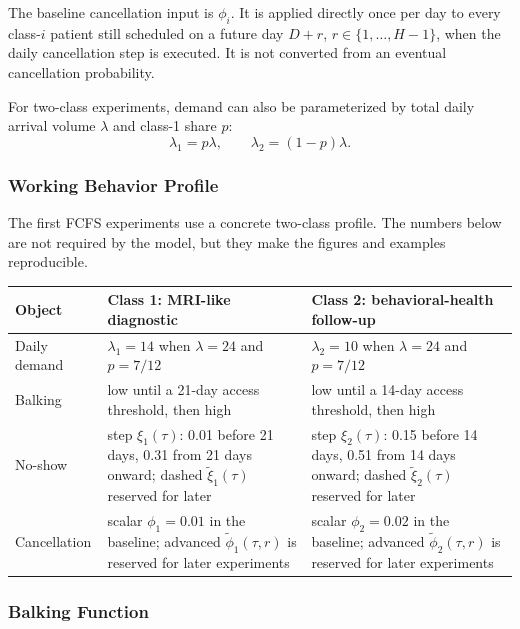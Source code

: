 \documentclass[11pt]{article}
\begin{document}
The baseline cancellation input is \(\phi_i\). It is applied directly once per day to every
class-\(i\) patient still scheduled on a future day \(D+r\), \(r\in\{1,\dots,H-1\}\), when the daily
cancellation step is executed. It is not converted from an eventual cancellation probability.

For two-class experiments, demand can also be parameterized by total daily arrival volume
\(\lambda\) and class-1 share \(p\):
\[
\lambda_1=p\lambda,\qquad
\lambda_2=(1-p)\lambda.
\]

\subsubsection{Working Behavior Profile}

The first FCFS experiments use a concrete two-class profile. The numbers below are not required by
the model, but they make the figures and examples reproducible.

\begin{center}
\small
\begin{tabular}{L{0.24\textwidth} L{0.31\textwidth} L{0.31\textwidth}}
\toprule
\textbf{Object} & \textbf{Class 1: MRI-like diagnostic} & \textbf{Class 2: behavioral-health follow-up} \\
\midrule
Daily demand & \(\lambda_1=14\) when \(\lambda=24\) and \(p=7/12\) & \(\lambda_2=10\) when \(\lambda=24\) and \(p=7/12\) \\
\addlinespace
Balking & low until a 21-day access threshold, then high & low until a 14-day access threshold, then high \\
\addlinespace
No-show & step \(\xi_1(\tau)\): 0.01 before 21 days, 0.31 from 21 days onward; dashed \(\tilde{\xi}_1(\tau)\) reserved for later & step \(\xi_2(\tau)\): 0.15 before 14 days, 0.51 from 14 days onward; dashed \(\tilde{\xi}_2(\tau)\) reserved for later \\
\addlinespace
Cancellation & scalar \(\phi_1=0.01\) in the baseline; advanced \(\tilde{\phi}_1(\tau,r)\) is reserved for later experiments & scalar \(\phi_2=0.02\) in the baseline; advanced \(\tilde{\phi}_2(\tau,r)\) is reserved for later experiments \\
\bottomrule
\end{tabular}
\normalsize
\end{center}

\subsubsection{Balking Function}
\end{document}
